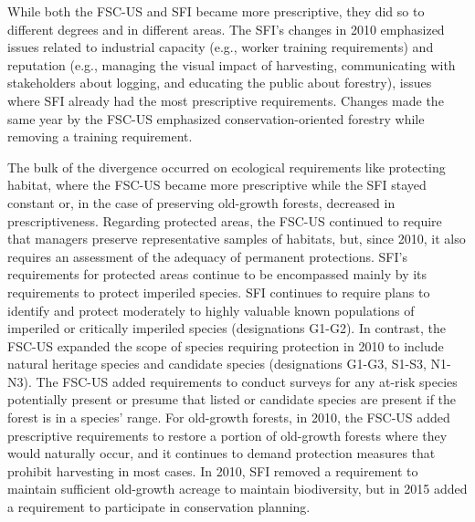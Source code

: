 \documentclass[
      12pt,
            Review ]{article}
\begin{document}


While both the FSC-US and SFI became more prescriptive, they did so to different degrees and in different areas. The SFI's changes in 2010 emphasized issues related to industrial capacity (e.g., worker training requirements) and reputation (e.g., managing the visual impact of harvesting, communicating with stakeholders about logging, and educating the public about forestry), issues where SFI already had the most prescriptive requirements. Changes made the same year by the FSC-US emphasized conservation-oriented forestry while removing a training requirement.

The bulk of the divergence occurred on ecological requirements like protecting habitat, where the FSC-US became more prescriptive while the SFI stayed constant or, in the case of preserving old-growth forests, decreased in prescriptiveness. Regarding protected areas, the FSC-US continued to require that managers preserve representative samples of habitats, but, since 2010, it also requires an assessment of the adequacy of permanent protections. SFI's requirements for protected areas continue to be encompassed mainly by its requirements to protect imperiled species. SFI continues to require plans to identify and protect moderately to highly valuable known populations of imperiled or critically imperiled species (designations G1-G2). In contrast, the FSC-US expanded the scope of species requiring protection in 2010 to include natural heritage species and candidate species (designations G1-G3, S1-S3, N1-N3). The FSC-US added requirements to conduct surveys for any at-risk species potentially present or presume that listed or candidate species are present if the forest is in a species' range. For old-growth forests, in 2010, the FSC-US added prescriptive requirements to restore a portion of old-growth forests where they would naturally occur, and it continues to demand protection measures that prohibit harvesting in most cases. In 2010, SFI removed a requirement to maintain sufficient old-growth acreage to maintain biodiversity, but in 2015 added a requirement to participate in conservation planning.
\end{document}
